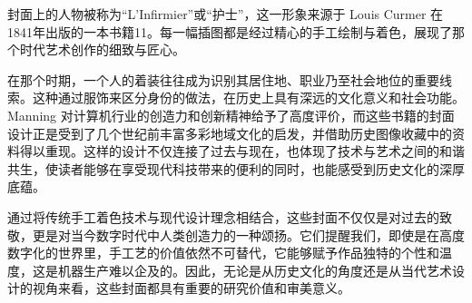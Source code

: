 封面上的人物被称为“L’Infirmier”或“护士”，这一形象来源于 Louis Curmer 在1841年出版的一本书籍11。每一幅插图都是经过精心的手工绘制与着色，展现了那个时代艺术创作的细致与匠心。

在那个时期，一个人的着装往往成为识别其居住地、职业乃至社会地位的重要线索。这种通过服饰来区分身份的做法，在历史上具有深远的文化意义和社会功能。Manning 对计算机行业的创造力和创新精神给予了高度评价，而这些书籍的封面设计正是受到了几个世纪前丰富多彩地域文化的启发，并借助历史图像收藏中的资料得以重现。这样的设计不仅连接了过去与现在，也体现了技术与艺术之间的和谐共生，使读者能够在享受现代科技带来的便利的同时，也能感受到历史文化的深厚底蕴。

通过将传统手工着色技术与现代设计理念相结合，这些封面不仅仅是对过去的致敬，更是对当今数字时代中人类创造力的一种颂扬。它们提醒我们，即使是在高度数字化的世界里，手工艺的价值依然不可替代，它能够赋予作品独特的个性和温度，这是机器生产难以企及的。因此，无论是从历史文化的角度还是从当代艺术设计的视角来看，这些封面都具有重要的研究价值和审美意义。
